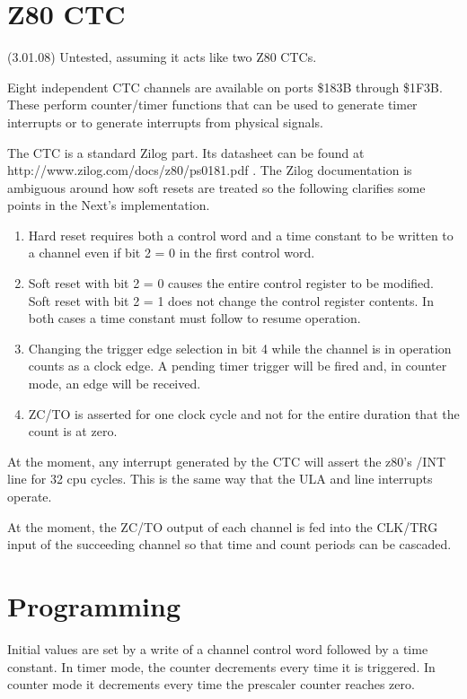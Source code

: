 \section{Z80 CTC}
(3.01.08) Untested, assuming it acts like two Z80 CTCs.

Eight independent CTC channels are available on ports \$183B through
\$1F3B.  These perform counter/timer functions that can be used to
generate timer interrupts or to generate interrupts from physical
signals.

The CTC is a standard Zilog part.  Its datasheet can be found at
http://www.zilog.com/docs/z80/ps0181.pdf .  The Zilog documentation is
ambiguous around how soft resets are treated so the following
clarifies some points in the Next's implementation.

\begin{enumerate}
\item Hard reset requires both a control word and a time constant to
  be written to a channel even if bit 2 = 0 in the first control word.
\item Soft reset with bit 2 = 0 causes the entire control register to
  be modified.  Soft reset with bit 2 = 1 does not change the control
  register contents.  In both cases a time constant must follow to
  resume operation.
\item Changing the trigger edge selection in bit 4 while the channel
  is in operation counts as a clock edge.  A pending timer trigger
  will be fired and, in counter mode, an edge will be received.
\item ZC/TO is asserted for one clock cycle and not for the entire
  duration that the count is at zero.
\end{enumerate}
At the moment, any interrupt generated by the CTC will assert the
z80's /INT line for 32 cpu cycles.  This is the same way that the ULA
and line interrupts operate.

At the moment, the ZC/TO output of each channel is fed into the
CLK/TRG input of the succeeding channel so that time and count periods
can be cascaded.

\section{Programming}
Initial values are set by a write of a channel control word followed
by a time constant. In timer mode, the counter decrements every time
it is triggered. In counter mode it decrements every time the
prescaler counter reaches zero.

